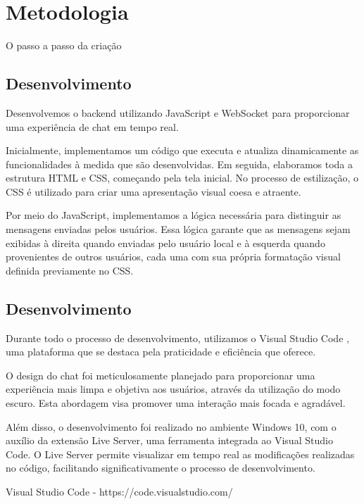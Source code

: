\chapter{Metodologia}
\label{ch:identificador}
	\begin{resumocapitulo}
		O passo a passo da criação
	\end{resumocapitulo}

	\section{Desenvolvimento}	
Desenvolvemos o backend utilizando JavaScript e WebSocket para proporcionar uma experiência de chat em tempo real.

Inicialmente, implementamos um código que executa e atualiza dinamicamente as funcionalidades à medida que são desenvolvidas. Em seguida, elaboramos toda a estrutura HTML e CSS, começando pela tela inicial. No processo de estilização, o CSS é utilizado para criar uma apresentação visual coesa e atraente.

Por meio do JavaScript, implementamos a lógica necessária para distinguir as mensagens enviadas pelos usuários. Essa lógica garante que as mensagens sejam exibidas à direita quando enviadas pelo usuário local e à esquerda quando provenientes de outros usuários, cada uma com sua própria formatação visual definida previamente no CSS.

	\section{Desenvolvimento}

Durante todo o processo de desenvolvimento, utilizamos o Visual Studio Code , uma plataforma que se destaca pela praticidade e eficiência que oferece.

O design do chat foi meticulosamente planejado para proporcionar uma experiência mais limpa e objetiva aos usuários, através da utilização do modo escuro. Esta abordagem visa promover uma interação mais focada e agradável.

Além disso, o desenvolvimento foi realizado no ambiente Windows 10, com o auxílio da extensão Live Server, uma ferramenta integrada ao Visual Studio Code. O Live Server permite visualizar em tempo real as modificações realizadas no código, facilitando significativamente o processo de desenvolvimento.

 Visual Studio Code - https://code.visualstudio.com/
 